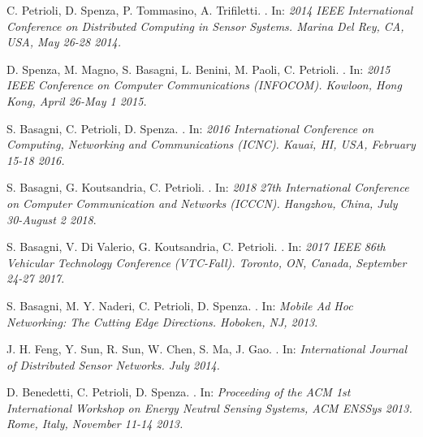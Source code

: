 \documentclass[binding=0.6cm,TFA]{sapthesis}
\begin{document}
\begin{thebibliography}{9}

    C. Petrioli, D. Spenza, P. Tommasino, A. Trifiletti.
    .
    In: \textit{2014 IEEE International Conference on Distributed Computing in Sensor Systems. Marina Del Rey, CA, USA, May 26-28 2014.}

    D. Spenza, M. Magno, S. Basagni, L. Benini, M. Paoli, C. Petrioli.
    .
    In: \textit{2015 IEEE Conference on Computer Communications (INFOCOM). Kowloon, Hong Kong, April 26-May 1 2015.}

    S. Basagni, C. Petrioli, D. Spenza.
    .
    In: \textit{2016 International Conference on Computing, Networking and Communications (ICNC). Kauai, HI, USA, February 15-18 2016.}

    S. Basagni, G. Koutsandria, C. Petrioli.
    .
    In: \textit{2018 27th International Conference on Computer Communication and Networks (ICCCN). Hangzhou, China, July 30-August 2 2018}.

    S. Basagni, V. Di Valerio, G. Koutsandria, C. Petrioli.
    .
    In: \textit{2017 IEEE 86th Vehicular Technology Conference (VTC-Fall). Toronto, ON, Canada, September 24-27 2017}.

    S. Basagni, M. Y. Naderi, C. Petrioli, D. Spenza.
    .
    In: \textit{Mobile Ad Hoc Networking: The Cutting Edge Directions. Hoboken, NJ, 2013}.

    \newpage        %

    J. H. Feng, Y. Sun, R. Sun, W. Chen, S. Ma, J. Gao.
    .
    In: \textit{International Journal of Distributed Sensor Networks. July 2014.}

    D. Benedetti, C. Petrioli, D. Spenza.
    .
    In: \textit{Proceeding of the ACM 1st International Workshop on Energy Neutral Sensing Systems, ACM ENSSys 2013. Rome, Italy, November 11-14 2013.}


\end{thebibliography}
\end{document}
